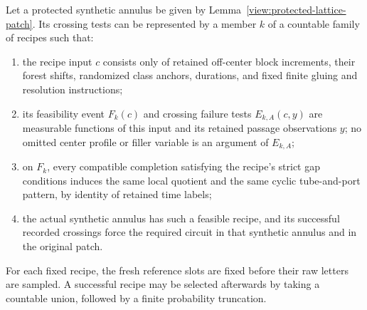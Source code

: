 \begin{lemma}
\label{view:annular-recipes}
Let a protected synthetic annulus be given by
Lemma~\ref{view:protected-lattice-patch}.  Its crossing tests can be
represented by a member $k$ of a countable family of recipes such that:
\begin{enumerate}[label=(\roman*)]
\item the recipe input $c$ consists only of retained off-center block
increments, their forest shifts, randomized class anchors, durations,
and fixed finite gluing and resolution instructions;
\item its feasibility event $F_k(c)$ and crossing failure tests
$E_{k,A}(c,y)$ are measurable functions of this input and its retained
passage observations $y$; no omitted center profile or filler variable
is an argument of $E_{k,A}$;
\item on $F_k$, every compatible completion satisfying the recipe's
strict gap conditions induces the same local quotient and the same
cyclic tube-and-port pattern, by identity of retained time labels;
\item the actual synthetic annulus has such a feasible recipe, and its
successful recorded crossings force the required circuit in that
synthetic annulus and in the original patch.
\end{enumerate}
For each fixed recipe, the fresh reference slots are fixed before their
raw letters are sampled.  A successful recipe may be selected afterwards
by taking a countable union, followed by a finite probability truncation.
\end{lemma}

